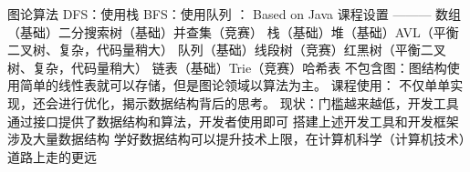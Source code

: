 {}\markdownRendererUlBeginTight
\markdownRendererUlItem 图论算法 DFS：使用栈 BFS：使用队列\markdownRendererUlItemEnd 
\markdownRendererUlEndTight \markdownRendererOlItemEnd 
\markdownRendererOlEnd \markdownRendererInterblockSeparator
{}： Based on Java\markdownRendererInterblockSeparator
{}\markdownRendererPipe{}\markdownRendererPipe{}课程设置\markdownRendererPipe{}\markdownRendererPipe{} \markdownRendererPipe{}---\markdownRendererPipe{}---\markdownRendererPipe{}---\markdownRendererPipe{} \markdownRendererPipe{}数组（基础）\markdownRendererPipe{}二分搜索树（基础）\markdownRendererPipe{}并查集（竞赛）\markdownRendererPipe{} \markdownRendererPipe{}栈（基础）\markdownRendererPipe{}堆（基础）\markdownRendererPipe{}AVL（平衡二叉树、复杂，代码量稍大）\markdownRendererPipe{} \markdownRendererPipe{}队列（基础）\markdownRendererPipe{}线段树（竞赛）\markdownRendererPipe{}红黑树（平衡二叉树、复杂，代码量稍大）\markdownRendererPipe{} \markdownRendererPipe{}链表（基础）\markdownRendererPipe{}Trie（竞赛）\markdownRendererPipe{}哈希表\markdownRendererPipe{}\markdownRendererInterblockSeparator
{}不包含图：图结构使用简单的线性表就可以存储，但是图论领域以算法为主。\markdownRendererInterblockSeparator
{}课程使用：\markdownRendererInterblockSeparator
{}不仅单单实现，还会进行优化，揭示数据结构背后的思考。\markdownRendererInterblockSeparator
{}\markdownRendererInterblockSeparator
{}现状：门槛越来越低，开发工具通过接口提供了数据结构和算法，开发者使用即可 搭建上述开发工具和开发框架涉及大量数据结构\markdownRendererInterblockSeparator
{}学好数据结构可以提升技术上限，在计算机科学（计算机技术）道路上走的更远\relax